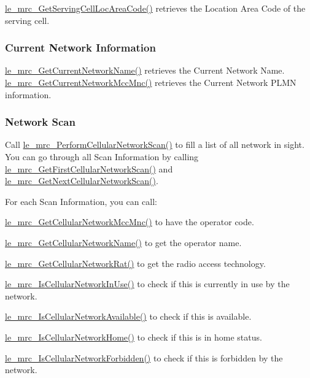 \hyperlink{le__mrc__interface_8h_a8ba03765e7595f85783f6f6a022311f8}{le\+\_\+mrc\+\_\+\+Get\+Serving\+Cell\+Loc\+Area\+Code()} retrieves the Location Area Code of the serving cell.\hypertarget{c_mrc_le_mrc_network_information}{}\subsubsection{Current Network Information}\label{c_mrc_le_mrc_network_information}
\hyperlink{le__mrc__interface_8h_a27e5eaddd6df34e4bfcee7d25775591e}{le\+\_\+mrc\+\_\+\+Get\+Current\+Network\+Name()} retrieves the Current Network Name. \hyperlink{le__mrc__interface_8h_a2e476636ca33c40ce18b73b11a6f9f55}{le\+\_\+mrc\+\_\+\+Get\+Current\+Network\+Mcc\+Mnc()} retrieves the Current Network P\+L\+M\+N information.\hypertarget{c_mrc_le_mrc_networkScan}{}\subsubsection{Network Scan}\label{c_mrc_le_mrc_networkScan}
Call \hyperlink{le__mrc__interface_8h_ab4a246dd466fa8175aca0158e0cab227}{le\+\_\+mrc\+\_\+\+Perform\+Cellular\+Network\+Scan()} to fill a list of all network in sight. You can go through all Scan Information by calling \hyperlink{le__mrc__interface_8h_ae006d053b037cec589aa85053472a2af}{le\+\_\+mrc\+\_\+\+Get\+First\+Cellular\+Network\+Scan()} and \hyperlink{le__mrc__interface_8h_ae0ca9f0c1c106d6ddeef784c6bb0d69b}{le\+\_\+mrc\+\_\+\+Get\+Next\+Cellular\+Network\+Scan()}.

For each Scan Information, you can call\+:


\begin{DoxyItemize}
\item \hyperlink{le__mrc__interface_8h_af4fa2d3f3c9a664b8e46478dba048f2e}{le\+\_\+mrc\+\_\+\+Get\+Cellular\+Network\+Mcc\+Mnc()} to have the operator code.
\item \hyperlink{le__mrc__interface_8h_a82cb12c5f02baccbb04b0af1be4eb031}{le\+\_\+mrc\+\_\+\+Get\+Cellular\+Network\+Name()} to get the operator name.
\item \hyperlink{le__mrc__interface_8h_ad33fbe1d2b7acee0e47f3e54cab78274}{le\+\_\+mrc\+\_\+\+Get\+Cellular\+Network\+Rat()} to get the radio access technology.
\item \hyperlink{le__mrc__interface_8h_a4c859fc1364c183aa1d26a022db365c6}{le\+\_\+mrc\+\_\+\+Is\+Cellular\+Network\+In\+Use()} to check if this is currently in use by the network.
\item \hyperlink{le__mrc__interface_8h_a72ca8072f90d453169baff44441c41c0}{le\+\_\+mrc\+\_\+\+Is\+Cellular\+Network\+Available()} to check if this is available.
\item \hyperlink{le__mrc__interface_8h_a7333dfc638f50524f9c6fd81457828ba}{le\+\_\+mrc\+\_\+\+Is\+Cellular\+Network\+Home()} to check if this is in home status.
\item \hyperlink{le__mrc__interface_8h_a699a52d014550124a5b3362ee888a780}{le\+\_\+mrc\+\_\+\+Is\+Cellular\+Network\+Forbidden()} to check if this is forbidden by the network.
\end{DoxyItemize}

